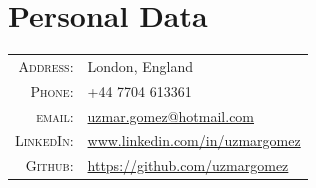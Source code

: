 \documentclass[a4paper,10pt]{article} %
\begin{document}
\bigskip
\section{Personal Data}
\bigskip
\begin{tabular}{rl}
\textsc{Address:} & London, England \\
\textsc{Phone:} & +44 7704 613361\\
\textsc{email:} & \href{mailto:uzmar.gomez@hotmail.com}{uzmar.gomez@hotmail.com}\\
\textsc{LinkedIn:} & \href{www.linkedin.com}{www.linkedin.com/in/uzmargomez}\\
\textsc{Github:} & \href{https://github.com/uzmargomez}{https://github.com/uzmargomez}%
\end{tabular}

\bigskip
\end{document}
